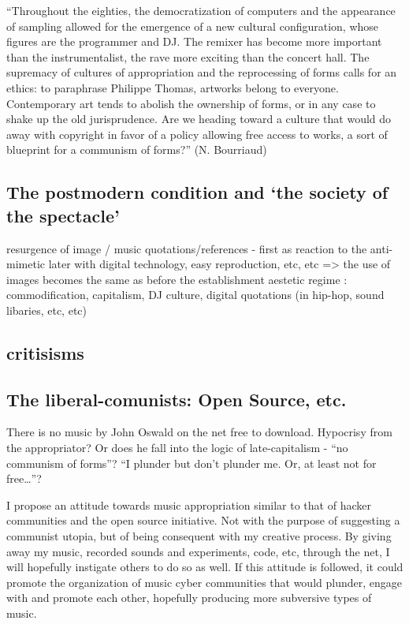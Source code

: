 ``Throughout the eighties, the democratization of computers and the appearance of sampling allowed for the emergence of a new cultural configuration, whose figures are the programmer and DJ. The remixer has become more important than the instrumentalist, the rave more exciting than the concert hall. The supremacy of cultures of appropriation and the reprocessing of forms calls for an ethics: to paraphrase Philippe Thomas, artworks belong to everyone. Contemporary art tends to abolish the ownership of forms, or in any case to shake up the old jurisprudence. Are we heading toward a culture that would do away with copyright in favor of a policy allowing free access to works, a sort of blueprint for a communism of forms?'' (N. Bourriaud)

\subsection{The postmodern condition and `the society of the spectacle'}

resurgence of image / music quotations/references - first as reaction to the anti-mimetic
later with digital technology, easy reproduction, etc, etc => the use of images becomes the same as before the establishment aestetic regime : commodification, capitalism, DJ culture, digital quotations (in hip-hop, sound libaries, etc, etc)

\subsection{critisisms} 
\subsection{The liberal-comunists: Open Source, etc.} 

There is no music by John Oswald on the net free to download. Hypocrisy from the appropriator? Or does he fall into the logic of late-capitalism - “no communism of forms”? “I plunder but don’t plunder me. Or, at least not for free…”? 

I propose an attitude towards music appropriation similar to that of hacker communities and the open source initiative. Not with the purpose of suggesting a communist utopia, but of being consequent with my creative process. By giving away my music, recorded sounds and experiments, code, etc, through the net, I will hopefully instigate others to do so as well. If this attitude is followed, it could promote the organization of music cyber communities that would plunder, engage with and promote each other, hopefully producing more subversive types of music.

